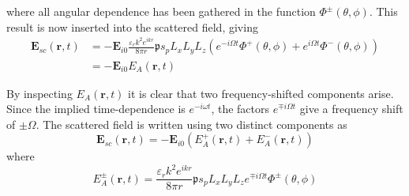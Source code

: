 \documentclass[11pt,twoside]{eitExjobb}
\begin{document}
	
	where all angular dependence has been gathered in the function $\Phi^\pm (\theta,\phi)$. This result is now inserted into the scattered field, giving
	\begin{equation*}
	\begin{split}
		\bm{E}_{sc}(\bm{r},t) &= -\bm{E}_{i0} \frac{\varepsilon_rk^2 e^{ikr}}{8\pi r} \mathfrak{p} s_p L_x L_y L_z \left( e^{-i\Omega t} \Phi^+ (\theta,\phi)  + e^{i\Omega t} \Phi^- (\theta,\phi) \right) \\
		&= -\bm{E}_{i0} E_A(\bm{r},t)
	\end{split}
	\end{equation*}
	
	By inspecting $E_A(\bm{r},t)$ it is clear that two frequency-shifted components arise. Since the implied time-dependence is $e^{-i\omega t}$, the factors $e^{\mp i\Omega t}$ give a frequency shift of $\pm \Omega$. The scattered field is written using two distinct components as
	\begin{equation*}
		\bm{E}_{sc} (\bm{r},t) = -\bm{E}_{i0} \left( E_A^+ (\bm{r},t) + E_A^- (\bm{r},t) \right)
	\end{equation*}
	where
	\begin{equation*}
		E_A^\pm (\bm{r},t) = \frac{\varepsilon_rk^2 e^{ikr}}{8\pi r} \mathfrak{p} s_p L_x L_y L_z e^{\mp i\Omega t} \Phi^\pm (\theta,\phi)
	\end{equation*}
	
\end{document}
